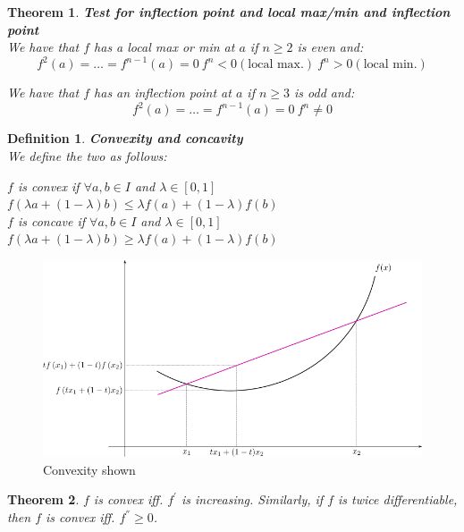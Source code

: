 \documentclass[titlepage]{article}
\newtheorem{theorem}{Theorem}[section]
\newtheorem{definition}{Definition}
\begin{document}
\begin{theorem}\textbf{Test for inflection point and local max/min and inflection point}
\\

We have that $f$ has a local max or min at $a$ if $n\geq 2$ is even and:
$$f^{2}(a) = \hdots = f^{n-1}(a) = 0 \ f^{n} < 0 (\text{local max.}) \ f^{n} > 0 (\text{local min.})$$

We have that $f$ has an inflection point at $a$ if $n \geq 3$ is odd and:
$$f^{2}(a) = \hdots = f^{n-1}(a) = 0 \ f^{n} \not = 0 $$
\end{theorem}

\begin{definition}\textbf{Convexity and concavity}
\\

We define the two as follows:

$f$ is convex if $\forall a,b \in I$ and $\lambda \in [0,1]$ $f(\lambda a + (1-\lambda)b) \leq \lambda f(a) + (1- \lambda)f(b)$
\\

$f$ is concave if $\forall a,b \in I$ and $\lambda \in [0,1]$ $f(\lambda a + (1-\lambda)b) \geq \lambda f(a) + (1- \lambda)f(b)$


\end{definition}


\begin{figure}[H]
    \centering
    \includegraphics[scale = 0.3]{epflLectureNotes/analysis/figures/convex.png}
    \caption{Convexity shown}
    \label{}
\end{figure}



\begin{theorem}
$f$ is convex iff. $f^{'}$ is increasing. Similarly, if $f$ is twice differentiable, then $f$ is convex iff. $f^{''} \geq 0$. 
\end{theorem}
\end{document}
